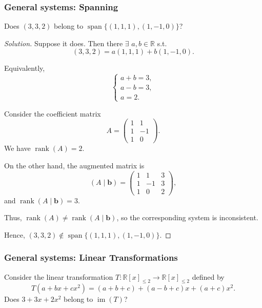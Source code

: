 \documentclass[12pt]{article}
\newenvironment{solution}
{\begin{proof}[Solution]}
{\end{proof}}
\begin{document}
\subsubsection{General systems: Spanning}
Does $(3,3,2)$ belong to $\operatorname{span}\{(1,1,1),(1,-1,0)\}$?
\begin{solution}
Suppose it does. Then there $\exists$ $a,b\in\mathbb{R}$ s.t.
\[
(3,3,2)=a(1,1,1)+b(1,-1,0).
\]

Equivalently,
\[
\begin{cases}
a+b=3,\\
a-b=3,\\
a=2.
\end{cases}
\]

Consider the coefficient matrix
\[
A=
\begin{pmatrix}
1 & 1\\
1 & -1\\
1 & 0
\end{pmatrix}.
\]
We have $\operatorname{rank}(A)=2$.

On the other hand, the augmented matrix is
\[
(A\mid\mathbf{b})=
\left(
\begin{array}{cc|c}
1 & 1  & 3\\
1 & -1 & 3\\
1 & 0  & 2
\end{array}
\right),
\]
and $\operatorname{rank}(A\mid\mathbf{b})=3$.

Thus, $\operatorname{rank}(A)\neq\operatorname{rank}(A\mid\mathbf{b})$,
so the corresponding system is inconsistent.

Hence,
$\boxed{
(3,3,2)
\notin
\operatorname{span}\{(1,1,1),(1,-1,0)\}
}.$

\end{solution}

\subsubsection{General systems: Linear Transformations}

Consider the linear transformation $T:\mathbb{R}[x]_{\leq 2}\to\mathbb{R}[x]_{\leq 2}$ defined by
\[
T(a+bx+cx^2)=(a+b+c)+(a-b+c)x+(a+c)x^2.
\]
Does $3+3x+2x^2$ belong to $\operatorname{im}(T)$?
\end{document}
